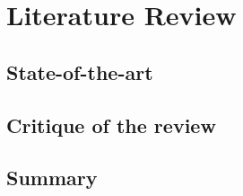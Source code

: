 \chapter{Literature Review}
\label{ch:lit_rev}


\section{State-of-the-art}

\section{Critique of the review}

\section{Summary} 